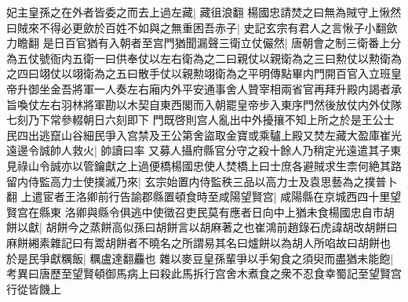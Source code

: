 妃主皇孫之在外者皆委之而去上過左藏|{
	藏徂浪翻}
楊國忠請焚之曰無為賊守上愀然曰賊來不得必更歛於百姓不如與之無重困吾赤子|{
	史記玄宗有君人之言愀子小翻歛力瞻翻}
是日百官猶有入朝者至宫門猶聞漏聲三衛立仗儼然|{
	唐朝會之制三衛番上分為五仗號衙内五衛一曰供奉仗以左右衛為之二曰親仗以親衛為之三曰勲仗以勲衛為之四曰翊仗以翊衛為之五曰散手仗以親勲翊衛為之平明傳點畢内門開百官入立班皇帝升御坐金吾將軍一人奏左右廂内外平安通事舍人贊宰相兩省官再拜升殿内謁者承旨喚仗左右羽林將軍勘以木契自東西閣而入朝罷皇帝步入東序門然後放仗内外仗隊七刻乃下常參輟朝日六刻即下}
門既啓則宫人亂出中外擾攘不知上所之於是王公士民四出逃竄山谷細民爭入宫禁及王公第舍盜取金寶或乘驢上殿又焚左藏大盈庫崔光遠邊令誠帥人救火|{
	帥讀曰率}
又募人攝府縣官分守之殺十餘人乃稍定光遠遣其子東見祿山令誠亦以管鑰獻之上過便橋楊國忠使人焚橋上曰士庶各避賊求生柰何絶其路留内侍監高力士使撲滅乃來|{
	玄宗始置内侍監秩三品以高力士及袁思藝為之撲普卜翻}
上遣宦者王洛卿前行告諭郡縣置頓食時至咸陽望賢宫|{
	咸陽縣在京城西四十里望賢宫在縣東}
洛卿與縣令俱逃中使徵召吏民莫有應者日向中上猶未食楊國忠自市胡餅以獻|{
	胡餅今之蒸餅高似孫曰胡餅言以胡麻著之也崔鴻前趙錄石虎諱胡改胡餅曰麻餅緗素雜記曰有鬻胡餅者不曉名之所謂易其名曰爐餅以為胡人所啗故曰胡餅也}
於是民爭獻糲飯|{
	糲盧達翻麤也}
雜以麥豆皇孫輩爭以手匊食之須臾而盡猶未能飽|{
	考異曰唐歷至望賢頓御馬病上曰殺此馬拆行宫舍木煮食之衆不忍食幸蜀記至望賢宫行從皆饑上}


